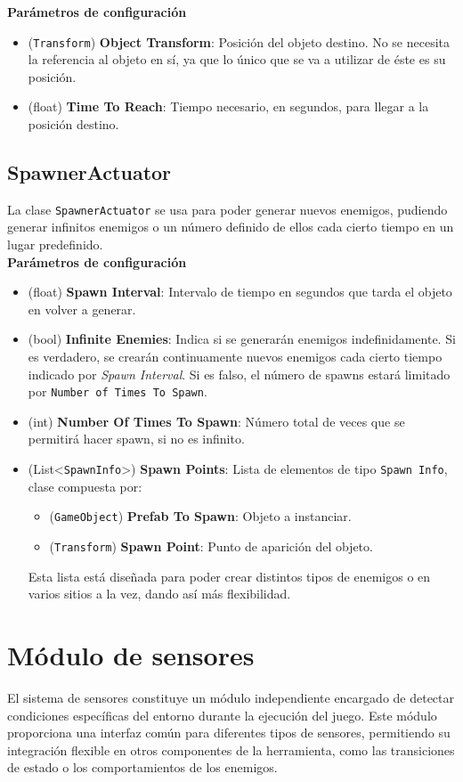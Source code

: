 \textbf{Parámetros de configuración}
\begin{itemize} 
	\item (\texttt{Transform}) \textbf{Object Transform}: Posición del objeto destino. No se necesita la referencia al objeto en sí, ya que lo único que se va a utilizar de éste es su posición.
	\item (float) \textbf{Time To Reach}: Tiempo necesario, en segundos, para llegar a la posición destino.
\end{itemize}

\subsection{SpawnerActuator}
La clase \texttt{SpawnerActuator} se usa para poder generar nuevos enemigos, pudiendo generar infinitos enemigos o un número definido de ellos cada cierto tiempo en un lugar predefinido.\\

\textbf{Parámetros de configuración}
\begin{itemize}
    \item (float) \textbf{Spawn Interval}: Intervalo de tiempo en segundos que tarda el objeto en volver a generar. 
    \item (bool) \textbf{Infinite Enemies}: Indica si se generarán enemigos indefinidamente. Si es verdadero, se crearán continuamente nuevos enemigos cada cierto tiempo indicado por \textit{Spawn Interval}. Si es falso, el número de spawns estará limitado por \texttt{Number of Times To Spawn}.
    \item (int) \textbf{Number Of Times To Spawn}: Número total de veces que se permitirá hacer spawn, si no es infinito.
    \item (List<\texttt{SpawnInfo}>) \textbf{Spawn Points}: Lista de elementos de tipo \texttt{Spawn Info}, clase compuesta por:
    \begin{itemize} 
	\item (\texttt{GameObject}) \textbf{Prefab To Spawn}: Objeto a instanciar.
	\item (\texttt{Transform}) \textbf{Spawn Point}: Punto de aparición del objeto.
    \end{itemize}
    Esta lista está diseñada para poder crear distintos tipos de enemigos o en varios sitios a la vez, dando así más flexibilidad.
\end{itemize}


\section{Módulo de sensores}
El sistema de sensores constituye un módulo independiente encargado de detectar condiciones específicas del entorno durante la ejecución del juego. Este módulo proporciona una interfaz común para diferentes tipos de sensores, permitiendo su integración flexible en otros componentes de la herramienta, como las transiciones de estado o los comportamientos de los enemigos.\\

